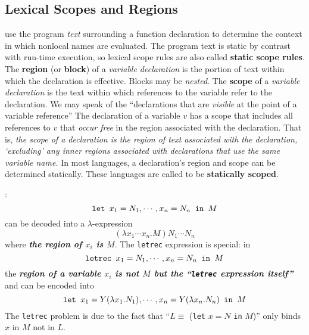 \documentclass{article}
\begin{document}
\subsection{Lexical Scopes and Regions}
\bit
{} use the program {\em{}text\/} surrounding
	a function declaration to determine the context in which nonlocal
	names are evaluated.
	\bit
	\w The program text is static by contrast with run-time execution,
		so lexical scope rules are also called
		{\bf{}static scope rules}.
	\eit
\w The {\bf{}region} (or {\bf{}block}) 
	of a {\em{}variable declaration\/} is the
	portion of text within which the declaration is effective.
	\bit
	\w Blocks may be {\em{}nested\/}.
	\eit
\w The {\bf{}scope} of a {\em{}variable declaration\/} is the text within
	which references to the variable refer to the declaration.
	\bit
	\w We may speak of the ``declarations that are
		{\em{}visible\/} at the point of a variable
		reference''
	\w The declaration of a variable $v$ has a scope that 
		includes all references to $v$ that {\em{}occur
		free\/} in the region associated with the declaration.
	\w That is, {\em{}the scope of a declaration is the region of text
		associated with the declaration, `excluding' any inner regions
		associated with declarations that use the same variable
		name.\/}
	\eit
\w In most languages, a declaration's region and scope can be
	determined statically. These languages are called to be
	{\bf{}statically scoped}.

:
	\[ \mbox{\tt{}let\ } x_1 = N_1, \cdots, x_n = N_n \mbox{\tt\ in\ }
	M \]
	can be decoded into a $\lambda$-expression
	\[ (\lambda{x_1\cdots{x_n}}.M) N_1 \cdots N_n \]
	where {\sl\bfseries{}the region of $x_i$ is $M$\/}.
	\bit
	\w The {\tt{}letrec} expression is special: in
	\[ \mbox{\tt{}letrec\ } x_1 = N_1, \cdots, x_n = N_n \mbox{\tt\ in\ }
		M \]
		the {\sl\bfseries{}region of a variable 
		$x_i$ is not $M$ but the 
		``{\tt{}letrec}	expression itself''\/} and can be encoded into
	\[ \mbox{\tt{}let\ } x_1 = Y(\lambda{x_1}.N_1), \cdots, 
		x_n = Y(\lambda{x_n}.N_n) \mbox{\tt\ in\ }
	M \]
	\w The {\tt{}letrec} problem is due to the fact 
		that ``$L \equiv $ ({\tt{}let} $x = N$ {\tt{}in}
		$M$)'' only binds $x$ in $M$ not in $L$.
	\eit
\eit
\end{document}
